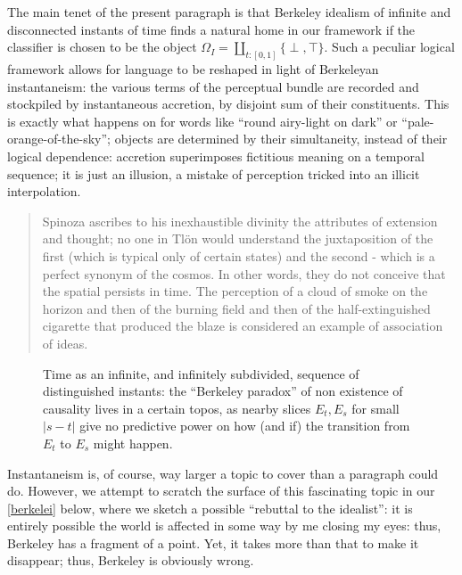 \begin{example}\label{incendiata}
  The main tenet of the present paragraph is that Berkeley idealism of infinite and disconnected instants of time finds a natural home in our framework if the classifier is chosen to be the object $\Omega_I = \coprod_{t : [0,1]} \{ \perp,\top\}$. Such a peculiar logical framework allows for language to be reshaped in light of Berkeleyan instantaneism: the various terms of the perceptual bundle are recorded and stockpiled by instantaneous accretion, by disjoint sum of their constituents. This is exactly what happens on \tlon for words like ``round airy-light on dark'' or ``pale-orange-of-the-sky''; objects are determined by their simultaneity, instead of their logical dependence: accretion superimposes fictitious meaning on a temporal sequence; it is just an illusion, a mistake of perception tricked into an illicit interpolation.
  \begin{quote}
    \hspace{.5em} Spinoza ascribes to his inexhaustible divinity the attributes of extension and thought; no one in Tlön would understand the juxtaposition of the first (which is typical only of certain states) and the second - which is a perfect synonym of the cosmos. In other words, they do not conceive that the spatial persists in time. The perception of a cloud of smoke on the horizon and then of the burning field and then of the half-extinguished cigarette that produced the blaze is considered an example of association of ideas.   \hfill\cite{tlonEN}
  \end{quote}
  \begin{center}
    \begin{figure}[h]
      \caption{Time as an infinite, and infinitely subdivided, sequence of distinguished instants: the ``Berkeley paradox'' of non existence of causality lives in a certain topos, as nearby slices $E_t, E_s$ for small $|s-t|$ give no predictive power on how (and if) the transition from $E_t$ to $E_s$ might happen.}
      \label{fig:berkeley}
    \end{figure}
  \end{center}
\end{example}
Instantaneism is, of course, way larger a topic to cover than a paragraph could do. However, we attempt to scratch the surface of this fascinating topic in our \autoref{berkelei} below, where we sketch a possible ``rebuttal to the idealist'': it is entirely possible the world is affected in some way by me closing my eyes: thus, Berkeley has a fragment of a point. Yet, it takes more than that to make it disappear; thus, Berkeley is obviously wrong.

